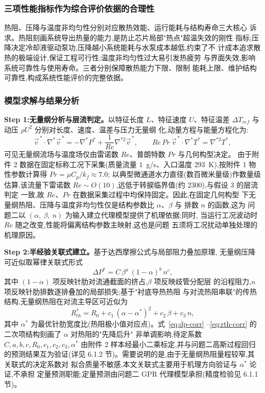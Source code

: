 \subsubsection{三项性能指标作为综合评价依据的合理性}

热阻、压降与温度非均匀性分别对应散热效能、运行能耗与结构寿命三大核心
诉求。热阻刻画系统导出热量的能力,是防止芯片局部"热点"超温失效的刚性
指标;压降决定冷却液驱动泵功,压降越小系统能耗与水泵成本越低,约束了不
计成本追求散热的极端设计,保证工程可行性;温度非均匀性过大易引发热疲劳
与界面失效,影响系统可靠性与使用寿命。三者分别保障散热能力下限、限制
能耗上限、维护结构可靠性,构成系统性能评价的完整依据。

\subsubsection{模型求解与结果分析}

\textbf{Step 1:无量纲分析与层流判定。}以特征长度 $L$、特征速度 $U$、特征温差
$\Delta T_{ref}$ 与动压 $\rho U^2$ 分别对长度、速度、温差与压力无量纲
化,动量方程与能量方程化为:
\begin{equation}
  \vec{v}^{\,*} \cdot \nabla^* \vec{v}^{\,*} = -\nabla^* P^* +
  \frac{1}{Re}\nabla^{*2} \vec{v}^{\,*}, \qquad
  Re\,Pr\ \vec{v}^{\,*} \cdot \nabla^* T^* = \nabla^{*2} T^*,
  \label{eq:dimensionless}
\end{equation}
可见无量纲流场与温度场仅由雷诺数 $Re$、普朗特数 $Pr$ 与几何构型决定。
由于附件 2 数据在固定标称工况下采集(质量流量 $1$~g/s、入口温度
$293$~K),按附件 1 物性参数计算得 $Pr = \mu C_p / k_f \approx 7.0$;
以典型微通道水力直径(数百微米量级)作数量级估算,该流量下雷诺数
$Re \sim O(10)$,远低于转捩临界值(约 $2300$),与假设 3 的层流判定
一致,故 $Re$、$Pr$ 在数据采集过程中均保持固定。因此,在固定几何构型
下无量纲热阻、压降与温度非均匀性仅是结构参数比 $\alpha$、$\beta$ 与
排数 $n$ 的函数,这为
问题二以 $(\alpha,\ \beta,\ n)$ 为输入建立代理模型提供了机理依据;同时,
当运行工况波动时 $Re$ 随之改变,性能将偏离结构参数主映射,这也是问题
五须将工况扰动单独处理的机理原因。

\textbf{Step 2:半经验关联式建立。}基于达西摩擦公式与局部阻力叠加原理,
无量纲压降可近似取幂律关联式形式
\begin{equation}
  \Delta P^* = C \, \beta^{a}\, (1-\alpha)^{b}\, n^{c},
  \label{eq:dp-corr}
\end{equation}
其中 $(1-\alpha)$ 项反映针肋对流通截面的挤占,$\beta$ 项反映歧管分配层
的沿程阻力,$n$ 项反映针肋排数逐排叠加的局部损失;基于"衬底导热热阻
与对流热阻串联"的传热结构,无量纲热阻在对流主导区可近似为
\begin{equation}
  R_{th}^* = R_0 + c_1\,(\alpha - \alpha^*)^2 + c_2\,\beta + c_3\,n,
  \label{eq:rth-corr}
\end{equation}
其中 $\alpha^*$ 为最优针肋宽度比(热阻极小值对应点)。式~\eqref{eq:dp-corr}
--\eqref{eq:rth-corr} 的二次项结构刻画了 $\alpha$ 对热阻的"先降后升"
非单调影响,待定系数 $C, a, b, c, R_0, c_1, c_2, c_3, \alpha^*$ 由附件 2
样本经最小二乘标定,并与问题二高斯过程回归的预测结果互为验证(详见
6.1.2 节)。需要说明的是,由于无量纲热阻量程较窄,其关联式的决定系数对
拟合质量不敏感,本文关联式主要用于机理方向验证与 $\alpha^*$ 论证,不承担
定量预测职能;定量预测由问题二 GPR 代理模型承担(精度检验见 6.1.1 节)。

